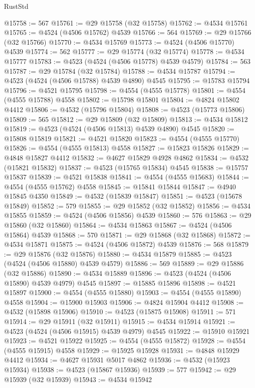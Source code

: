 \begin{lexlean}{RustStd}
\begin{coremodule}
@15758 := 567
@15761 := @29 @15758 (@32 @15758)
@15762 := @4534 @15761
@15765 := @4524 (@4506 @15762) @4539
@15766 := 564
@15769 := @29 @15766 (@32 @15766)
@15770 := @4534 @15769
@15773 := @4524 (@4506 @15770) @4539
@15774 := 562
@15777 := @29 @15774 (@32 @15774)
@15778 := @4534 @15777
@15783 := @4523 (@4524 (@4506 @15778) @4539 @4579)
@15784 := 563
@15787 := @29 @15784 (@32 @15784)
@15788 := @4534 @15787
@15794 := @4523 (@4524 (@4506 @15788) @4539 @4890) @4545
@15795 := @15783 @15794
@15796 := @4521 @15795
@15798 := @4554 (@4555 @15778)
@15801 := @4554 (@4555 @15788) @4558
@15802 := @15798 @15801
@15804 := @4824 @15802 @4412
@15806 := @4532 (@15796 @15804)
@15808 := @4523 (@15773 @15806)
@15809 := 565
@15812 := @29 @15809 (@32 @15809)
@15813 := @4534 @15812
@15819 := @4523 (@4524 (@4506 @15813) @4539 @4890) @4545
@15820 := @15808 @15819
@15821 := @4521 @15820
@15823 := @4554 (@4555 @15770)
@15826 := @4554 (@4555 @15813) @4558
@15827 := @15823 @15826
@15829 := @4848 @15827 @4412
@15832 := @4627 @15829 @4928 @4862
@15834 := @4532 (@15821 @15832)
@15837 := @4523 (@15765 @15834) @4545
@15838 := @15757 @15837
@15839 := @4521 @15838
@15841 := @4554 (@4555 @15683)
@15844 := @4554 (@4555 @15762) @4558
@15845 := @15841 @15844
@15847 := @4940 @15845 @4350
@15849 := @4532 (@15839 @15847)
@15851 := @4523 (@15678 @15849)
@15852 := 579
@15855 := @29 @15852 (@32 @15852)
@15856 := @4534 @15855
@15859 := @4524 (@4506 @15856) @4539
@15860 := 576
@15863 := @29 @15860 (@32 @15860)
@15864 := @4534 @15863
@15867 := @4524 (@4506 @15864) @4539
@15868 := 570
@15871 := @29 @15868 (@32 @15868)
@15872 := @4534 @15871
@15875 := @4524 (@4506 @15872) @4539
@15876 := 568
@15879 := @29 @15876 (@32 @15876)
@15880 := @4534 @15879
@15885 := @4523 (@4524 (@4506 @15880) @4539 @4579)
@15886 := 569
@15889 := @29 @15886 (@32 @15886)
@15890 := @4534 @15889
@15896 := @4523 (@4524 (@4506 @15890) @4539 @4979) @4545
@15897 := @15885 @15896
@15898 := @4521 @15897
@15900 := @4554 (@4555 @15880)
@15903 := @4554 (@4555 @15890) @4558
@15904 := @15900 @15903
@15906 := @4824 @15904 @4412
@15908 := @4532 (@15898 @15906)
@15910 := @4523 (@15875 @15908)
@15911 := 571
@15914 := @29 @15911 (@32 @15911)
@15915 := @4534 @15914
@15921 := @4523 (@4524 (@4506 @15915) @4539 @4979) @4545
@15922 := @15910 @15921
@15923 := @4521 @15922
@15925 := @4554 (@4555 @15872)
@15928 := @4554 (@4555 @15915) @4558
@15929 := @15925 @15928
@15931 := @4848 @15929 @4412
@15934 := @4627 @15931 @5017 @4862
@15936 := @4532 (@15923 @15934)
@15938 := @4523 (@15867 @15936)
@15939 := 577
@15942 := @29 @15939 (@32 @15939)
@15943 := @4534 @15942

\end{coremodule}
\end{lexlean}
